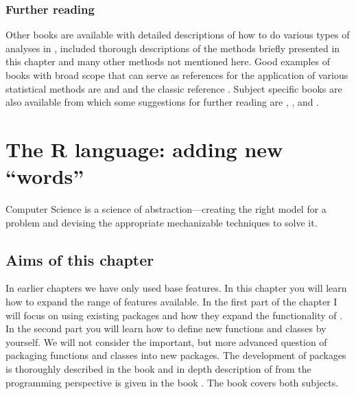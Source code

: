 \documentclass[krantz2]{krantz}\usepackage{knitr}%
\begin{document}
\subsection{Further reading}

Other books are available with detailed descriptions of how to do various types of analyses in \Rlang, included thorough descriptions of the methods briefly presented in this chapter and many other methods not mentioned here. Good examples of books with broad scope that can serve as references for the application of various statistical methods are  \autocite{Everitt2011} and  \autocite{Crawley2012} and the classic reference  \autocite{Venables2002}. Subject specific books are also available from which some suggestions for further reading are  \autocite{Faraway2004},  \autocite{Faraway2006},  \autocite{Pinheiro2000} and  \autocite{Wood2017}.






\chapter{The R language: adding new ``words''}\label{chap:R:functions}

\begin{VF}
Computer Science is a science of abstraction---creating the right model for a problem and devising the appropriate mechanizable techniques to solve it.

\end{VF}


\section{Aims of this chapter}

In earlier chapters we have only used base \Rlang features. In this chapter you will learn how to expand the range of features available. In the first part of the chapter I will focus on using existing packages and how they expand the functionality of \Rlang. In the second part you will learn how to define new functions and classes by yourself. We will not consider the important, but more advanced question of packaging functions and classes into new packages. The development of packages is thoroughly described in the book  \autocite{Wickham2015} and in depth description of \Rlang from the programming perspective is given in the book  \autocite{Wickham2019}. The book  \autocite{Chambers2016} covers both subjects.
\end{document}

